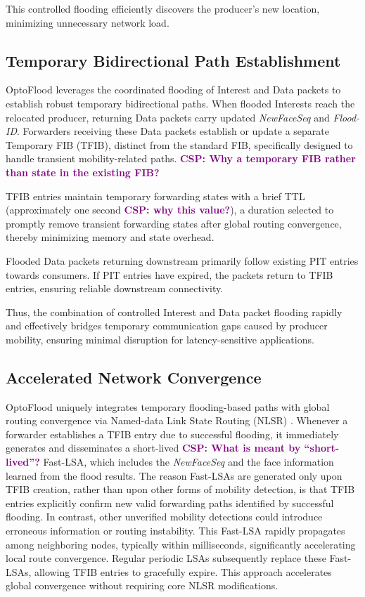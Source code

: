 \documentclass[conference]{IEEEtran}
\newcommand{\csp}[1]{\textbf{\textcolor{purple}{CSP: #1}}}
\begin{document}
This controlled flooding efficiently discovers the producer's new location, minimizing unnecessary network load.

\subsection{Temporary Bidirectional Path Establishment}
\label{sec:solution:bidir}

OptoFlood leverages the coordinated flooding of Interest and Data packets to establish robust temporary bidirectional paths. When flooded Interests reach the relocated producer, returning Data packets carry updated \textit{NewFaceSeq} and \textit{Flood-ID}. Forwarders receiving these Data packets establish or update a separate Temporary FIB (TFIB), distinct from the standard FIB, specifically designed to handle transient mobility-related paths.
\csp{Why a temporary FIB rather than state in the existing FIB?}

TFIB entries maintain temporary forwarding states with a brief TTL (approximately one second \csp{why this value?}), a duration selected to promptly remove transient forwarding states after global routing convergence, thereby minimizing memory and state overhead.

Flooded Data packets returning downstream primarily follow existing PIT entries towards consumers. If PIT entries have expired, the packets return to TFIB entries, ensuring reliable downstream connectivity.

Thus, the combination of controlled Interest and Data packet flooding rapidly and effectively bridges temporary communication gaps caused by producer mobility, ensuring minimal disruption for latency-sensitive applications.


\subsection{Accelerated Network Convergence}
\label{sec:solution:convergence}

OptoFlood uniquely integrates temporary flooding-based paths with global routing convergence via Named-data Link State Routing (NLSR) \cite{}. Whenever a forwarder establishes a TFIB entry due to successful flooding, it immediately generates and disseminates a short-lived \csp{What is meant by ``short-lived''?} Fast-LSA, which includes the \textit{NewFaceSeq} and the face information learned from the flood results. The reason Fast-LSAs are generated only upon TFIB creation, rather than upon other forms of mobility detection, is that TFIB entries explicitly confirm new valid forwarding paths identified by successful flooding. In contrast, other unverified mobility detections could introduce erroneous information or routing instability. This Fast-LSA rapidly propagates among neighboring nodes, typically within milliseconds, significantly accelerating local route convergence. Regular periodic LSAs subsequently replace these Fast-LSAs, allowing TFIB entries to gracefully expire. This approach accelerates global convergence without requiring core NLSR modifications.
\end{document}
